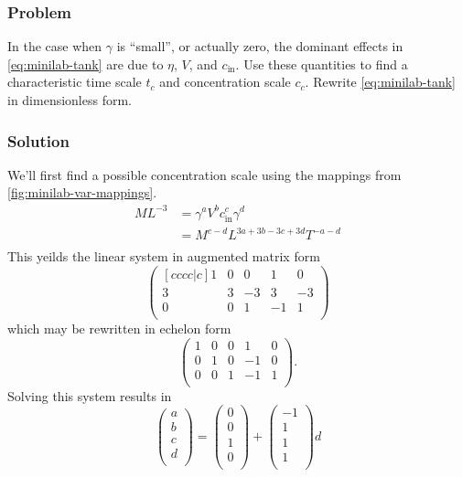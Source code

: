 \documentclass[12pt]{article}
\begin{document}
\subsubsection*{Problem}
In the case when $\gamma$ is ``small'', or actually zero, the dominant effects
in \cref{eq:minilab-tank} are due to $\eta$, $V$, and $c_{\text{in}}$. Use these
quantities to find a characteristic time scale $t_c$ and concentration scale
$c_c$. Rewrite \cref{eq:minilab-tank} in dimensionless form.

\subsubsection*{Solution}
We'll first find a possible concentration scale using the mappings from
\cref{fig:minilab-var-mappings}.
\begin{equation}
  \begin{aligned}
    ML^{-3} &= \gamma^aV^bc_{\text{in}}^c\gamma^d \\
    &= M^{c-d}L^{3a+3b-3c+3d}T^{-a-d} \\
  \end{aligned}
\end{equation}
This yeilds the linear system in augmented matrix form
\begin{equation}
  \begin{pmatrix}[cccc|c]
    1 & 0 & 0 & 1 & 0 \\
    3 & 3 & -3 & 3 & -3 \\
    0 & 0 & 1 & -1 & 1 \\
  \end{pmatrix}
\end{equation}
which may be rewritten in echelon form
\begin{equation}
  \begin{pmatrix}
    1 & 0 & 0 & 1 & 0 \\
    0 & 1 & 0 & -1 & 0 \\
    0 & 0 & 1 & -1 & 1 \\
  \end{pmatrix}.
\end{equation}
Solving this system results in
\begin{equation}
  \begin{pmatrix}
    a \\ b \\ c \\ d \\
  \end{pmatrix} =
  \begin{pmatrix}
    0 \\ 0 \\ 1 \\ 0 \\
  \end{pmatrix} +
  \begin{pmatrix}
    -1 \\ 1 \\ 1 \\ 1 \\
  \end{pmatrix}d
\end{equation}
\end{document}
